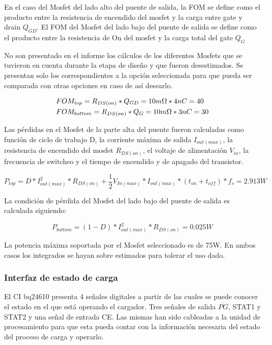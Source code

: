 \documentclass[10pt, a4paper]{report}
\begin{document}
En el caso del Mosfet del lado alto del puente de salida, la \acrshort{FOM} se
define como el producto entre la resistencia de encendido del mosfet y la carga
entre gate y drain $Q_{GD}$. El FOM del Mosfet del lado bajo del puente de
salida se define como el producto entre la resistencia de On del mosfet y la
carga total del gate $Q_{G}$

No son presentado en el informe los cálculos de los diferentes Mosfets que se
tuvieron en cuenta durante la etapa de diseño y que fueron desestimados. Se
presentan solo los correspondientes a la opción seleccionada para que pueda ser
comparada con otras opciones en caso de así desearlo. 

\begin{equation}
    \begin{split}
        &FOM_{top}=R_{DS (on)}*Q_{GD}=10m\ohm*4nC=40 \\
        &FOM_{bottom}=R_{DS (on)}*Q_{G}=10m\ohm*3nC=30
    \end{split}
\end{equation}

Las pérdidas en el Mosfet de la parte alta del puente fueron calculadas como
función de ciclo de trabajo D, la corriente máxima de salida $I_{out (max)}$, la
resistencia de encendido del mosfet $R_{DS(on)}$, el voltaje de alimentación
$V_{in}$, la frecuencia de switcheo y el tiempo de encendido y de apagado del
transistor.

\begin{equation}
    P_{top}=D*I_{out (max)}^{2}*R_{DS(on)}+\frac{1}{2}V_{In (max)}*I_{out (max)}*(t_{on}+t_{off})*f_{s}
        = 2.913W
\end{equation}

La condición de pérdida del Mosfet del lado bajo del puente de salida es
calculada siguiendo:

\begin{equation}
    P_{bottom}=(1-D)*I_{out (max)}^{2}*R_{DS(on)}=0.025W
\end{equation}

La potencia máxima soportada por el Mosfet seleccionado es de 75W. En ambos
casos los integrados se hayan sobre estimados para tolerar el uso dado. 

\subsubsection{Interfaz de estado de carga}\label{seq:cb_interface_ce}

El \acrshort{CI} bq24610 presenta 4 señales digitales a partir de las cuales se
puede conocer el estado en el que está operando el cargador. Tres señales de
salida $\overline{PG}$, STAT1 y STAT2 y una señal de entrada CE. Las mismas han
sido cableadas a la unidad de procesamiento para que esta pueda contar con la
información necesaria del estado del proceso de carga y operarlo.
\end{document}
